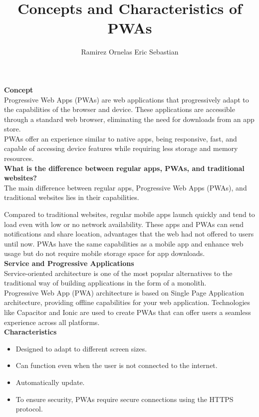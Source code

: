 \documentclass[10pt,a4paper]{article}
\title{Concepts and Characteristics of PWAs}
\author{Ramirez Ornelas Eric Sebastian}
\begin{document}
	\maketitle
	\textbf{Concept}\\
	Progressive Web Apps (PWAs) are web applications that progressively adapt to the capabilities of the browser and device. These applications are accessible through a standard web browser, eliminating the need for downloads from an app store.\\
	PWAs offer an experience similar to native apps, being responsive, fast, and capable of accessing device features while requiring less storage and memory resources.\\
	
	\textbf{What is the difference between regular apps, PWAs, and traditional websites?}\\
	The main difference between regular apps, Progressive Web Apps (PWAs), and traditional websites lies in their capabilities.
	
	Compared to traditional websites, regular mobile apps launch quickly and tend to load even with low or no network availability. These apps and PWAs can send notifications and share location, advantages that the web had not offered to users until now. PWAs have the same capabilities as a mobile app and enhance web usage but do not require mobile storage space for app downloads.\\
	
	\textbf{Service and Progressive Applications}\\
	Service-oriented architecture is one of the most popular alternatives to the traditional way of building applications in the form of a monolith.\\
	
	Progressive Web App (PWA) architecture is based on Single Page Application architecture, providing offline capabilities for your web application. Technologies like Capacitor and Ionic are used to create PWAs that can offer users a seamless experience across all platforms.\\
	
	\textbf{Characteristics}
	\begin{itemize}
		\item Designed to adapt to different screen sizes.
		\item Can function even when the user is not connected to the internet.
		\item Automatically update.
		\item To ensure security, PWAs require secure connections using the HTTPS protocol.
	\end{itemize}
	
\end{document}

